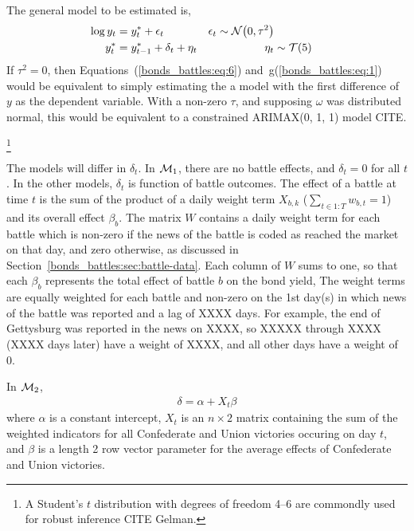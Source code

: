The general model to be estimated is,
\begin{align}
  \label{bonds_battles:eq:6}
  \log y_{t} &= y^{*}_{t} + \epsilon_{t} & \epsilon_{t} \sim \mathcal{N}\mathopen{}\left(0, \tau^{2}\right)\mathclose{} \\
  \label{bonds_battles:eq:1}
  y^{*}_{t} &= y^{*}_{t - 1} + \delta_{t} + \eta_{t} & \eta_{t} &\sim \mathcal{T}\mathopen{}\left(5\right)\mathclose{}{}
\end{align}
If $\tau^{2} = 0$, then Equations~(\ref{bonds_battles:eq:6}) and~g(\ref{bonds_battles:eq:1}) would be equivalent to simply estimating the a model with the first difference of $y$ as the dependent variable.
With a non-zero $\tau$, and supposing $\omega$ was distributed normal, this would be equivalent to a constrained ARIMAX(0, 1, 1) model CITE.

\footnote{A Student's $t$ distribution with degrees of freedom 4--6 are commondly used for robust inference CITE Gelman.}

The models will differ in $\delta_{t}$.
In $\mathcal{M}_{\text{1}}$, there are no battle effects, and $\delta_{t} = 0$ for all $t$.
In the other models, $\delta_{t}$ is function of battle outcomes.
The effect of a battle at time $t$ is the sum of the product of a daily weight term $X_{b,k}$ ($\sum_{t \in 1:T} w_{b,t} = 1$) and its overall effect $\beta_{b}$.
The matrix $W$ contains a daily weight term for each battle which is non-zero if the news of the battle is coded as reached the market on that day, and zero otherwise, as discussed in Section~\ref{bonds_battles:sec:battle-data}.
Each column of $W$ sums to one, so that each $\beta_{b}$ represents the total effect of battle $b$ on the bond yield,
The weight terms are equally weighted for each battle and non-zero on the 1st day(s) in which news of the battle was reported and a lag of XXXX days.
For example, the end of Gettysburg was reported in the news on XXXX, so XXXXX through XXXX (XXXX days later) have a weight of XXXX, and all other days have a weight of 0.

In $\mathcal{M}_{\text{2}}$, 
\begin{align}
  \label{bonds_battles:eq:2}
  \delta = \alpha + X_{t} \beta
\end{align}
where $\alpha$ is a constant intercept, $X_{t}$ is an $n \times 2$ matrix containing the sum of the weighted indicators for all Confederate and Union victories occuring on day $t$, 
and $\beta$ is a length 2 row vector parameter for the average effects of Confederate and Union victories.

